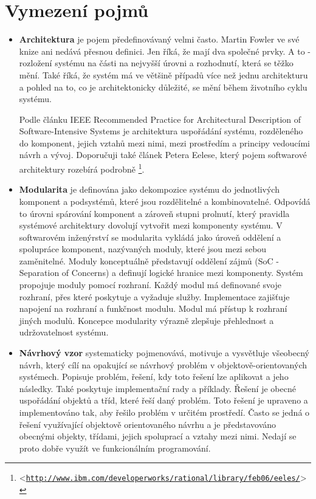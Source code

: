 \documentclass[11pt,twoside,a4paper]{book}
\let\oldUrl\url
\renewcommand\url[1]{<\texttt{\oldUrl{#1}}>}
\begin{document}
\section{Vymezení pojmů}
\begin{itemize}
\item \textbf{Architektura} je pojem předefinovávaný velmi často. Martin Fowler ve své knize \cite{PEAA} ani nedává přesnou definici. Jen říká, že mají dva společné prvky. A to - rozložení systému na části na nejvyšší úrovni a rozhodnutí, která se těžko mění. Také říká, že systém má ve většině případů více než jednu architekturu a pohled na to, co je architektonicky důležité, se mění během životního cyklu systému.

Podle článku IEEE Recommended Practice for Architectural Description of Software-Intensive Systems \cite{IEEE1471} je architektura uspořádání systému, rozděleného do komponent, jejich vztahů mezi nimi, mezi prostředím a principy vedoucími návrh a vývoj. Doporučuji také článek Petera Eelese, který pojem softwarové architektury rozebírá podrobně \footnote{\url{http://www.ibm.com/developerworks/rational/library/feb06/eeles/}}.


\item \textbf{Modularita} je definována jako dekompozice systému do jednotlivých komponent a podsystémů, které jsou rozdělitelné a kombinovatelné\cite{POSA}. Odpovídá to úrovni spárování komponent a zároveň stupni prolnutí, který pravidla systémové architektury dovolují vytvořit mezi komponenty systému. V softwarovém inženýrství se modularita vykládá jako úroveň oddělení a spolupráce komponent, nazývaných moduly, které jsou mezi sebou zaměnitelné. Moduly konceptuálně představují oddělení zájmů (SoC - Separation of Concerns) a definují logické hranice mezi komponenty. Systém propojuje moduly pomocí rozhraní. Každý modul má definované svoje rozhraní, přes které poskytuje a vyžaduje služby. Implementace zajišťuje napojení na rozhraní a funkčnost modulu. Modul má přístup k rozhraní jiných modulů. Koncepce modularity výrazně zlepšuje přehlednost a udržovatelnost systému\cite{POSA}\cite{wiki:modular-programming}. 

\item \textbf{Návrhový vzor} systematicky pojmenovává, motivuje a vysvětluje všeobecný návrh, který cílí na opakující se návrhový problém v objektově-orientovaných systémech. Popisuje problém, řešení, kdy toto řešení lze aplikovat a jeho následky. Také poskytuje implementační rady a příklady. Řešení je obecné uspořádání objektů a tříd, které řeší daný problém. Toto řešení je upraveno a implementováno tak, aby řešilo problém v určitém prostředí\cite{GOF}. Často se jedná o řešení využívající objektově orientovaného návrhu a je představováno obecnými objekty, třídami, jejich spoluprací a vztahy mezi nimi. Nedají se proto dobře využít ve funkcionálním programování. \cite{wiki:design-pattern-computer-science}


\end{itemize}
\end{document}
